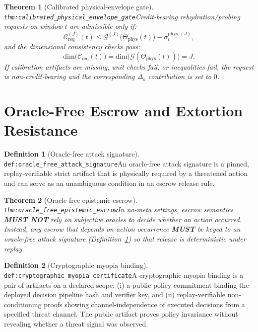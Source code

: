 \documentclass[11pt]{article}
\theoremstyle{definition}
\newtheorem{definition}{Definition}
\theoremstyle{plain}
\newtheorem{theorem}{Theorem}
\newcommand{\MUST}{\textbf{MUST}}
\newcommand{\MUSTNOT}{\textbf{MUST NOT}}
\newcommand{\lbl}[1]{\texttt{\footnotesize\nolinkurl{#1}}}
\newcommand{\DefLabel}[1]{\hfill{\small\lbl{#1}}}
\newcommand{\deltao}{\Delta_o}
\begin{document}
\begin{theorem}[Calibrated physical-envelope gate]\DefLabel{thm:calibrated_physical_envelope_gate}\label{thm:calibrated_physical_envelope_gate}
Credit-bearing rehydration/probing requests on window $t$ are admissible only if:
\[
\mathcal{C}^{(J)}_{\mathrm{req}}(t)\le \mathcal{G}^{(J)}\!\big(\Theta_{\mathrm{phys}}(t)\big)-\sigma^{\mathrm{phys},(J)}_t,
\]
and the dimensional consistency checks pass:
\[
\mathrm{dim}\!\big(\mathcal{C}_{\mathrm{req}}(t)\big)=\mathrm{dim}\!\big(\mathcal{G}(\Theta_{\mathrm{phys}}(t))\big)=J.
\]
If calibration artifacts are missing, unit checks fail, or inequalities fail, the request is non-credit-bearing and the corresponding $\deltao$ contribution is set to $0$.
\end{theorem}

\section{Oracle-Free Escrow and Extortion Resistance}\label{sec:extortion}
\begin{definition}[Oracle-free attack signature]\DefLabel{def:oracle_free_attack_signature}\label{def:oracle_free_attack_signature}
An oracle-free attack signature is a pinned, replay-verifiable strict artifact that is physically required by a threatened action and can serve as an unambiguous condition in an escrow release rule.
\end{definition}

\begin{theorem}[Oracle-free epistemic escrow]\DefLabel{thm:oracle_free_epistemic_escrow}\label{thm:oracle_free_epistemic_escrow}
In no-meta settings, escrow semantics \MUSTNOT{} rely on subjective oracles to decide whether an action occurred.
Instead, any escrow that depends on action occurrence \MUST{} be keyed to an oracle-free attack signature (Definition~\ref{def:oracle_free_attack_signature}) so that release is deterministic under replay.
\end{theorem}

\begin{definition}[Cryptographic myopia binding]\DefLabel{def:cryptographic_myopia_certificate}\label{def:cryptographic_myopia_certificate}
A cryptographic myopia binding is a pair of artifacts on a declared scope: (i) a public policy commitment binding the deployed decision pipeline hash and verifier key, and (ii) replay-verifiable non-conditioning proofs showing channel-independence of executed decisions from a specified threat channel.
The public artifact proves policy invariance without revealing whether a threat signal was observed.
\end{definition}
\end{document}
